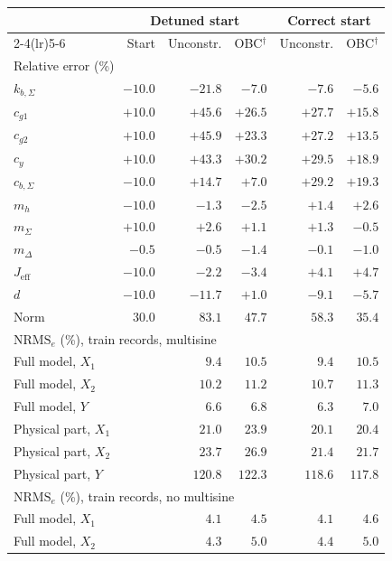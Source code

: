 \setlength{\tabcolsep}{3pt}
\begin{tabular}{l r r r r r}
\toprule
 & \multicolumn{3}{c}{Detuned start} & \multicolumn{2}{c}{Correct start}\\
\cmidrule(lr){2-4}\cmidrule(lr){5-6}
 & Start & Unconstr. & OBC$^\dagger$ & Unconstr. & OBC$^\dagger$\\
\midrule
\multicolumn{6}{l}{Relative error (\%)}\\
$k_{b,\Sigma}$ & $-10.0$ & $-21.8$ & $-7.0$ & $-7.6$ & $-5.6$\\
$c_{g1}$ & $+10.0$ & $+45.6$ & $+26.5$ & $+27.7$ & $+15.8$\\
$c_{g2}$ & $+10.0$ & $+45.9$ & $+23.3$ & $+27.2$ & $+13.5$\\
$c_y$ & $+10.0$ & $+43.3$ & $+30.2$ & $+29.5$ & $+18.9$\\
$c_{b,\Sigma}$ & $-10.0$ & $+14.7$ & $+7.0$ & $+29.2$ & $+19.3$\\
$m_h$ & $-10.0$ & $-1.3$ & $-2.5$ & $+1.4$ & $+2.6$\\
$m_\Sigma$ & $+10.0$ & $+2.6$ & $+1.1$ & $+1.3$ & $-0.5$\\
$m_\Delta$ & $-0.5$ & $-0.5$ & $-1.4$ & $-0.1$ & $-1.0$\\
$J_{\mathrm{eff}}$ & $-10.0$ & $-2.2$ & $-3.4$ & $+4.1$ & $+4.7$\\
$d$ & $-10.0$ & $-11.7$ & $+1.0$ & $-9.1$ & $-5.7$\\
Norm & $30.0$ & $83.1$ & $47.7$ & $58.3$ & $35.4$\\
\midrule
\multicolumn{6}{l}{$\mathrm{NRMS}_e$ (\%), train records, multisine}\\
Full model, $X_1$ &  & $9.4$ & $10.5$ & $9.4$ & $10.5$\\
Full model, $X_2$ &  & $10.2$ & $11.2$ & $10.7$ & $11.3$\\
Full model, $Y$ &  & $6.6$ & $6.8$ & $6.3$ & $7.0$\\
Physical part, $X_1$ &  & $21.0$ & $23.9$ & $20.1$ & $20.4$\\
Physical part, $X_2$ &  & $23.7$ & $26.9$ & $21.4$ & $21.7$\\
Physical part, $Y$ &  & $120.8$ & $122.3$ & $118.6$ & $117.8$\\
\midrule
\multicolumn{6}{l}{$\mathrm{NRMS}_e$ (\%), train records, no multisine}\\
Full model, $X_1$ &  & $4.1$ & $4.5$ & $4.1$ & $4.6$\\
Full model, $X_2$ &  & $4.3$ & $5.0$ & $4.4$ & $5.0$\\

\end{tabular}
